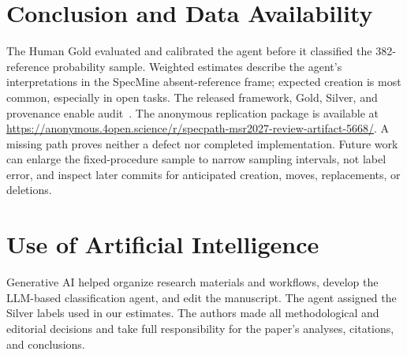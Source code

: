 \documentclass[10pt,conference]{IEEEtran}
\begin{document}
\section{Conclusion and Data Availability}
The Human Gold evaluated and calibrated the agent before it classified the 382-reference probability sample. Weighted estimates describe the agent's interpretations in the SpecMine absent-reference frame; expected creation is most common, especially in open tasks. The released framework, Gold, Silver, and provenance enable audit~\cite{artifact}. The anonymous replication package is available at \url{https://anonymous.4open.science/r/specpath-msr2027-review-artifact-5668/}. A missing path proves neither a defect nor completed implementation. Future work can enlarge the fixed-procedure sample to narrow sampling intervals, not label error, and inspect later commits for anticipated creation, moves, replacements, or deletions.

\section{Use of Artificial Intelligence}
Generative AI helped organize research materials and workflows, develop the LLM-based classification agent, and edit the manuscript. The agent assigned the Silver labels used in our estimates. The authors made all methodological and editorial decisions and take full responsibility for the paper's analyses, citations, and conclusions.

\clearpage


\end{document}
